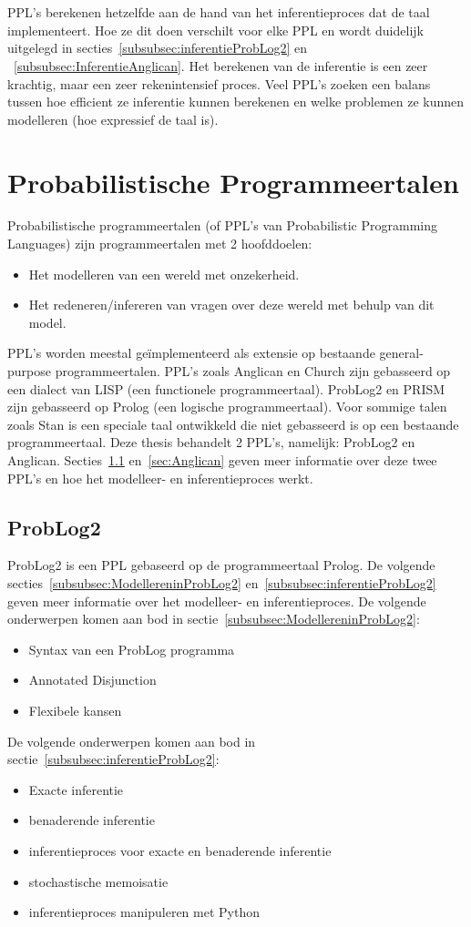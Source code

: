 \documentclass[12pt,a4paper,oneside]{book}
\theoremstyle{definition}
\begin{document}
\\\\
PPL's berekenen hetzelfde aan de hand van het inferentieproces dat de taal implementeert. Hoe ze dit doen verschilt voor elke PPL en wordt duidelijk uitgelegd in secties~\ref{subsubsec:inferentieProbLog2} en ~\ref{subsubsec:InferentieAnglican}. Het berekenen van de inferentie is een zeer krachtig, maar een zeer rekenintensief proces. Veel PPL's zoeken een balans tussen hoe efficient ze inferentie kunnen berekenen en welke problemen ze kunnen modelleren (hoe expressief de taal is).

\section{Probabilistische Programmeertalen}
Probabilistische programmeertalen (of PPL's van Probabilistic Programming Languages) zijn programmeertalen met 2 hoofddoelen:
\begin{itemize}
  \item Het modelleren van een wereld met onzekerheid.
  \item Het redeneren/infereren van vragen over deze wereld met behulp van dit model.
\end{itemize}
PPL's worden meestal ge\"{i}mplementeerd als extensie op bestaande general-purpose programmeertalen. PPL's zoals Anglican en Church zijn gebasseerd op een dialect van LISP (een functionele programmeertaal). ProbLog2 en PRISM zijn gebasseerd op Prolog (een logische programmeertaal). Voor sommige talen zoals Stan is een speciale taal ontwikkeld die niet gebasseerd is op een bestaande programmeertaal.
Deze thesis behandelt 2 PPL's, namelijk: ProbLog2 en Anglican. Secties~\ref{sec:ProbLog2} en~\ref{sec:Anglican} geven meer informatie over deze twee PPL's en hoe het modelleer- en inferentieproces werkt.
\subsection{ProbLog2}
\label{sec:ProbLog2}
ProbLog2 is een PPL gebaseerd op de programmeertaal Prolog. De volgende secties~\ref{subsubsec:ModellereninProbLog2} en~\ref{subsubsec:inferentieProbLog2} geven meer informatie over het modelleer- en inferentieproces. De volgende onderwerpen komen aan bod in sectie~\ref{subsubsec:ModellereninProbLog2}:
\begin{itemize}
	\item Syntax van een ProbLog programma
	\item Annotated Disjunction
	\item Flexibele kansen
\end{itemize} 
De volgende onderwerpen komen aan bod in sectie~\ref{subsubsec:inferentieProbLog2}:
\begin{itemize}
	\item Exacte inferentie
	\item benaderende inferentie
	\item inferentieproces voor exacte en benaderende inferentie
	\item stochastische memoisatie
	\item inferentieproces manipuleren met Python
\end{itemize} 
\end{document}

